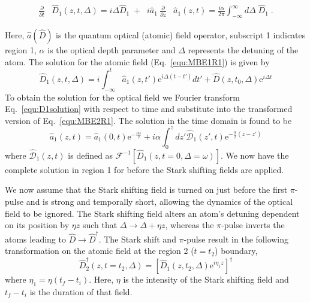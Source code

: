                                                                                                                                                                                                                                                                                                                                                                                                                                                                                                                                                                                                                                                                                                                                                                                                                                                                                                                                                                                                                                                                                                                                                                                                                                                                                                                                                                                                                                                                                                                                                                                                                                                                                                                                                                                                                                                                                                                                                                                                                                                                                                                                                                                                                                                                                                                                                                                                                                                                                                                                                                                                                                                                                                                                                                                                                                                                                                                                                                                                                                                                                                                                                                                                                                                                                                                                                                                                                                                                                                                                                                                                                                                                                                                                                                                                                                                                                                                                                                                                                                                                                                                                                                                                                                                                                                                                                                                                                                                                                                                                                                                                                                                                                                                                                                                                                                                                                                                                                                                                                                                                                                                                                                                                                                                                                                                                                                                                                                                                                                                                                                                                                                                                                                                                                                                                                                                                                                                                                                                                                                                                                                                                                                                                                                                                                                                                                                                                                                                                                                                                                                                                                                                                                                                                                                                                                                                                                                                                                                                                                                                                                                                                                                                                                                                                                                                                                                                                                                                                                                                                                                                                                                                                                                                                                                                                                                                                                                                                                                                                                                                                                                                                                                                                                                                                                                                                                                                                                                                                                                                                                                                                                                                                                                                                                                                                                                                                                                                                                                                                                                                                                                                                                                                                                                                                                                                                                                                                                                                                                                                                                                                                                                                                                                                                                                                                                                                                                                                                                                                                                                                                                                                                                                                                                                                                                                                                                                                                                                                                                                                                                                                                                                                                                                                                                                                                                                                                                                                                                                                                                                                                                                                                                                                                                                                                                                                                                                                                                                                                                                                                                                                                                                                                                                                                                                                                                                                                                                                                                                                                                                                                                                                                                                                                                                                                                                                                                                                                                                                                                                                                                                                                                                                                                                                                                                                                                                                                                                                                                                                                                                                                                                                                                                                                                                                                                                                                                                                                                                                                                                                                                                                                                                                                                                                                                                                                                                                                                                                                                                                                                                                                                                                                                                                                                                                                                                                                                                                                                                                                                                                                                                                                                                                                                                                                                                                                                                                                                                                                                                                                                                                                                                                                                                                                                                                                                                                                                                                                                                                                                                                                                                                                                                                                                                                                                                                                                                                                                                                                                                                                                                                                                                                                                                                                                                                                                                                                                                                                                                                                                                                                                                                                                                                                                                                                                                                                                                                                                                                                                                                                                                                                                                                                                                                                                                                                                                                                                                                                                                                                                                                                                                                                                                                                                                                                                                                                                                                                                                                                                                                                                                                                                                                                                                                                                                                                                                                                                                                                                                                                                                                                                                                                                                                                                                                                                                                                                                                                                                                                                                                                                                                                                                                                                                                                                                                                                                                                                                                                                                                                                                                                                                                                                                                                                                                                                                                                                                                                                                                                                                                                                                                                                                                                                                                                                                                                                                                                                                                                                                                                                                                                                                                                                                                                                                                                                                                                                                                                                                                                                                                                                                                                                                                                                                                                                                                                                                                                                                                                                                                                                                                                                                                                                                                                                                                                                                                                                                                                                                                                                                                                                                                                                                                                                                                                                                                                                                                                                                                                                                                                                                                                                                                                                                                                                                                                                                                                                                                                                                                                                                                                                                                                                                                                                                                                                                                                                                                                                                                                                                                                                                                                                                                                                                                                                                                                                                                                                                                                                                                                                                                                                                                                                                                                                                                                                                                                                                                                                                                                                                                                                                                                                                                                                                                                                                                                                                                                                                                                                                                                                                                                                                                                                                                                                                                                                                                                                                                                                                                                                                                                                                                                                                                                                                                                                                                                                                                                                                                                                                                                                                                                                                                                                                                                                                                                                                                                                                                                                                                                                                                                                                                                                                                                                                                                                                                                                                                                                                                                                                                                                                                                                                                                                                                                                                                                                                                                                                                                                                                                                                                                                                                                                                                                                                                                                                                                                                                                                                                                                                                                                                                                                                                                                                                                                                                                                                                                                                                                                                                                                                                                                                                                                                                                                                                                                                                                                                                                                                                                                                                                                                                                                                                                                                                                                                                                                                                                                                                                                                                                                                                                                                                                                                                                                                                                                                                                                                                                                                                                                                                                                                                                                                                                                                                                                                                                                                                                                                                                                                                                                                                                                                                                                                                                                                                                                                                                                                                                                                                                                                                                                                                                                                                                                                                                                                                                                                                                                                                                                                                                                                                                                                                                                                                                                                                                                                                                                                                                                                                                                                                                                                                                                                                                                                                                                                                                                                                                                                                                                                                                                                                                                                                                                                                                                                                                                                                                                                                                                                                                                                                                                                                                                                                                                                                                                                                                                                                                                                                                                                                                                                                                                                                                                                                                                                                                                                                                                                                                                                                                                                                                                                                                                                                                                                                                                                                                                                                                                                                                                                                                                                                                                                                                                                                                                                                                                                                                                                                                                                                                                                                                                                                                                                                                                                                                                                                                                                                                                                                                                                                                                                                                                                                                                                                                                                                                                                                                                                                                                                                                                                                                                                                                                                                                                                                                                                                                                                                                                                                                                                                                                                                                                                                                                                                                                                                                                                                                                                                                                                                                                                                                                                                                                                                                                                                                                                                                                                                                                                                                                                                                                                                                                                                                                                                                                                                                                                                                                                                                                                                                                                                                                                                                                                                                                                                                                                                                                                                                                                                                                                                                                                                                                                                                                                                                                                                                                                                                                                                                                                                                                                                                                                                                                                                                                                                                                                                                                                                                                                                                                                                                                                                                                                                                                                                                                                                                                                                                                                                                                                                                                                                                                                                                                                                                                                                                                                                                                                                                                                                                                                                                                                                                                                                                                                                                                                                                                                                                                                                                                                                                                                                                                                                                                                                                                                                                                                                                                                                                                                                                                                                                                                                                                                                                                                                                                                                                                                                                                                                                                                                                                                                                                                                                                                                                                                                                                                                                                                                                                                                                                                                                                                                                                                                                                                                                                                                                                                                                                                                                                                                                                                                                                                                                                                                                                                                                                                                                                                                                                                                                                                                                                                                                                                                                                                                                                                                                                                                                                                                                                                                                                                                                                                                                                                                                                                                                                                                                                                                                                                                                                                                                                                                                                                                                                                                                                                                                                                                                                                                                                                                                                                                                                                                                                                                                                                                                                                                                                                                                                                                                                                                                                                                                                                                                                                                                                                                                                                                                                                                                                                                                                                                                                                                                                                                                                                                                                                                                                                                                                                                                                                                                                                                                                                                                                                                                                                                                                                                                                                                                                                                                                                                                                                                                                                                                                                                                                                                                                                                                                                                                                                                                                                                                                                                                                                                                                                                                                                                                                                                                                                                                                                                                                                                                                                                                                                                                                                                                                                                                                                                                                                                                                                                                                                                                                                                                                                                                                                                                                                                                                                                                                                                                                                                                                                                                                                                                                                                                                                                                                                                                                                                                                                                                                                                                                                                                                                                                                                                                                                                                                                                                                                                                                                                                                                                                                                                                                                                                                                                                                                                                                                                                                                                                                                                                                                                                                                                                                                                                                                                                                                                                                                                                                                                                                                                                                                                                                                                                                                                                                                                                                                                                                                                                                                                                                                                                                                                                                                                                                                                                                                                                                                                                                                                    \documentclass[superscriptaddress,pra,twocolumn,showpacs,amsmath,amssymb,aps,a4paper]{revtex4}
\begin{document}
\begin{subequations}
 \label{equ:groundMBE}
 \begin{align}
  \label{equ:MBE1R1}
  \frac{\partial}{\partial t} & \hat{D}_{1 }(z,t,\Delta) = i \Delta \hat{D}_{1} \; +  \;\; i \hat{a}_{1} \

  \label{equ:MBE2R1}
  \frac{\partial}{\partial z} & \hat{a}_{1}(z,t) = \frac{i \alpha}{2 \pi} \int_{-\infty}^{\infty} d\Delta \;   \hat{D}_{1} \;.
 \end{align}
 \end{subequations}

 Here, $\hat{a} (\hat{D})$ is the quantum optical (atomic) field
 operator, subscript 1 indicates region 1, $\alpha$ is the optical
 depth parameter and $\Delta$ represents the detuning of the
 atom. The solution for the
 atomic field (Eq.~\ref{equ:MBE1R1}) is given by
\begin{equation}
\hat{D}_1(z,t,\Delta) = i \int^{t}_{-\infty} \hat{a}_1(z,t') \text{e}^{i\Delta (t-t')} dt' + \hat{D}(z,t_0,\Delta)\text{e}^{i\Delta t }\label{equ:D1solution}
\end{equation}
To obtain the solution for the optical field we Fourier transform
Eq.~\ref{equ:D1solution} with respect to time and substitute into the
transformed version of Eq.~\ref{equ:MBE2R1}. The solution in the time
domain is found to be
\begin{equation}
\hat{a}_1(z,t) = \hat{a}_1(0,t)\text{e}^{-\frac{\alpha z}{2}} +
i\alpha \int^z_0 dz' \hat{\mathcal{D}}_1(z',t)\text{e}^{-\frac{\alpha}{2}(z-z')}\label{equ:a1solution}
\end{equation}
where $\hat{\mathcal{D}}_1(z,t)$ is defined as
$\mathcal{F}^{-1}[\hat{D}_1(z,t = 0,\Delta=\omega)]$. We now have
the complete solution in region 1 for before the Stark shifting fields
are applied.

We now assume that the Stark shifting field is turned on just before
the first $\pi$-pulse and is strong and temporally short, allowing the
dynamics of the optical field to be ignored. The Stark shifting field
alters an atom's detuning dependent on its position by $\eta z$ such
that $\Delta \to \Delta + \eta z$, whereas the $\pi$-pulse inverts the
atoms leading to $\hat{D} \to \hat{D}^\dagger$. The Stark
shift and $\pi$-pulse result in the following transformation on the
atomic field at the region 2 ($t = t_2$) boundary,
\begin{equation}
\hat{D}^{\dagger}_2(z,t = t_2,\Delta) = [ \hat{D}_1(z,t_2,\Delta) \text{e}^{i\eta_1z} ]^{\dagger}
\end{equation}
where $\eta_1 = \eta (t_f -t_i)$. Here, $\eta$ is the intensity of the Stark shifting field and $t_f - t_i$ is the duration of that field.
\end{document}
